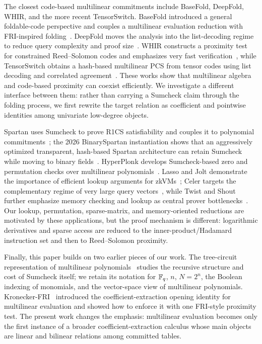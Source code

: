 The closest code-based multilinear commitments include BaseFold, DeepFold, WHIR, and the more recent TensorSwitch.  BaseFold introduced a general foldable-code perspective and couples a multilinear evaluation reduction with FRI-inspired folding~\cite{BaseFold24}.  DeepFold moves the analysis into the list-decoding regime to reduce query complexity and proof size~\cite{DeepFold25}.  WHIR constructs a proximity test for constrained Reed--Solomon codes and emphasizes very fast verification~\cite{WHIR24}, while TensorSwitch obtains a hash-based multilinear PCS from tensor codes using list decoding and correlated agreement~\cite{TensorSwitch26}.  These works show that multilinear algebra and code-based proximity can coexist efficiently.  We investigate a different interface between them: rather than carrying a Sumcheck claim through the folding process, we first rewrite the target relation as coefficient and pointwise identities among univariate low-degree objects.

Spartan uses Sumcheck to prove R1CS satisfiability and couples it to polynomial commitments~\cite{Setty20}; the 2026 BinarySpartan instantiation shows that an aggressively optimized transparent, hash-based Spartan architecture can retain Sumcheck while moving to binary fields~\cite{BinarySpartan26}.  HyperPlonk develops Sumcheck-based zero and permutation checks over multilinear polynomials~\cite{HyperPlonk23}.  Lasso and Jolt demonstrate the importance of efficient lookup arguments for zkVMs~\cite{Lasso23,Jolt23}; Celer targets the complementary regime of very large query vectors~\cite{Celer26}, while Twist and Shout further emphasize memory checking and lookup as central prover bottlenecks~\cite{TwistShout26}.  Our lookup, permutation, sparse-matrix, and memory-oriented reductions are motivated by these applications, but the proof mechanism is different: logarithmic derivatives and sparse access are reduced to the inner-product/Hadamard instruction set and then to Reed--Solomon proximity.

Finally, this paper builds on two earlier pieces of our work.  The tree-circuit representation of multilinear polynomials~\cite{MkhidaIguider26} studies the recursive structure and cost of Sumcheck itself; we retain its notation for $\mathbb{F}_q$, $n$, $N=2^n$, the Boolean indexing of monomials, and the vector-space view of multilinear polynomials.  Kronecker-FRI~\cite{KroneckerFRI26} introduced the coefficient-extraction opening identity for multilinear evaluation and showed how to enforce it with one FRI-style proximity test.  The present work changes the emphasis: multilinear evaluation becomes only the first instance of a broader coefficient-extraction calculus whose main objects are linear and bilinear relations among committed tables.

